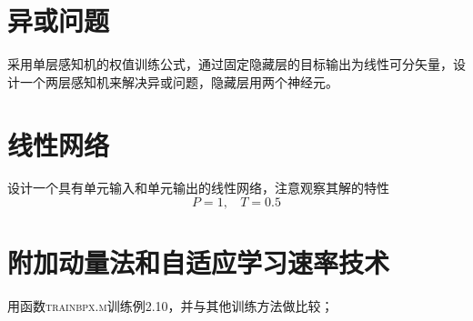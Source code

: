 \section{异或问题}

\begin{question}
    采用单层感知机的权值训练公式，通过固定隐藏层的目标输出为线性可分矢量，设计一个两层感知机来解决异或问题，隐藏层用两个神经元。
\end{question}

\vspace*{2em}

\section{线性网络}

\begin{question}
    设计一个具有单元输入和单元输出的线性网络，注意观察其解的特性
    \begin{equation}
        P=1,\ \ \ \ T=0.5
    \end{equation}
\end{question}

\section{附加动量法和自适应学习速率技术}

\begin{question}
    用函数\textsc{trainbpx.m}训练例2.10，并与其他训练方法做比较；
\end{question}